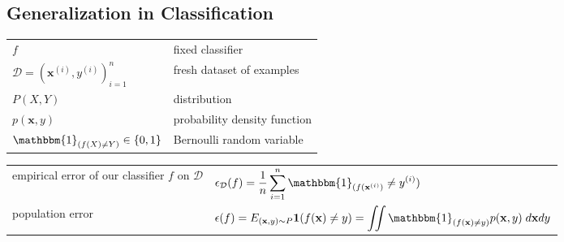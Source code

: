 \subsection*{Generalization in Classification \cite{dnn-1}}

\begin{customTableWrapper}{1.5}
\begin{table}[H]
    \centering
    \begin{tabular}{l l}
        $f$ & fixed classifier \\

        $\mathcal{D} = {(\mathbf{x}^{(i)},y^{(i)})}_{i=1}^n$ 
        & fresh dataset of examples \\

        $P(X,Y)$ & distribution\\

        $p(\mathbf{x},y)$ & probability density function \\

        $\mathbbm{1}_{(f(X) \neq Y)} \in \dCurlyBrac{0,1}$ & Bernoulli random variable \\

        
    \end{tabular}
\end{table}
\end{customTableWrapper}

\begin{customTableWrapper}{2}
\begin{table}[H]
    \centering
    \begin{tabular}{l l}
        empirical error of our classifier $f$ on $\mathcal{D}$ &
        $
            \epsilon_\mathcal{D}(f) 
            = \dfrac{1}{n}\dsum_{i=1}^n \mathbbm{1}_{(f(\mathbf{x}^{(i)})} \neq y^{(i)})
        $ \\

        
        population error &
        $
            \epsilon(f) 
            =  E_{(\mathbf{x}, y) \sim P} \mathbf{1}(f(\mathbf{x}) \neq y) 
            = \displaystyle\iint \mathbbm{1}_{(f(\mathbf{x}) \neq y)} p(\mathbf{x}, y) \;d\mathbf{x} dy
        $ \\

    \end{tabular}
\end{table}
\end{customTableWrapper}

